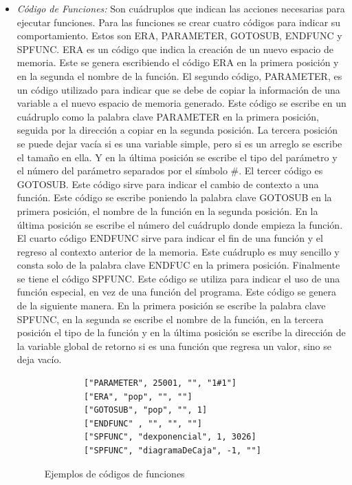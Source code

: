 \begin{itemize}
    \item \emph{Código de Funciones:} Son cuádruplos que indican las acciones necesarias para ejecutar funciones. Para las funciones se crear cuatro códigos para indicar su comportamiento. Estos son ERA, PARAMETER, GOTOSUB, ENDFUNC y SPFUNC. ERA es un código que indica la creación de un nuevo espacio de memoria. Este se genera escribiendo el código ERA en la primera posición y en la segunda el nombre de la función. El segundo código, PARAMETER, es un código utilizado para indicar que se debe de copiar la información de una variable a el nuevo espacio de memoria generado. Este código se escribe en un cuádruplo como la palabra clave PARAMETER en la primera posición, seguida por la dirección a copiar en la segunda posición. La tercera posición se puede dejar vacía si es una variable simple, pero si es un arreglo se escribe el tamaño en ella. Y en la última posición se escribe el tipo del parámetro y el número del parámetro separados por el símbolo \#. El tercer código es GOTOSUB. Este código sirve para indicar el cambio de contexto a una función. Este código se escribe poniendo la palabra clave GOTOSUB en la primera posición, el nombre de la función en la segunda posición. En la última posición se escribe el número del cuádruplo donde empieza la función. El cuarto código ENDFUNC sirve para indicar el fin de una función y el regreso al contexto anterior de la memoria. Este cuádruplo es muy sencillo y consta solo de la palabra clave ENDFUC en la primera posición. Finalmente se tiene el código SPFUNC. Este código se utiliza para indicar el uso de una función especial, en vez de una función del programa. Este código se genera de la siguiente manera. En la primera posición se escribe la palabra clave SPFUNC, en la segunda se escribe el nombre de la función, en la tercera posición el tipo de la función y en la última posición se escribe la dirección de la variable global de retorno si es una función que regresa un valor, sino se deja vacío.
    
\begin{figure}[!htbp]
    \centering
    \begin{lstlisting}
        ["PARAMETER", 25001, "", "1#1"]
        ["ERA", "pop", "", ""]
        ["GOTOSUB", "pop", "", 1]
        ["ENDFUNC" , "", "", ""]
        ["SPFUNC", "dexponencial", 1, 3026]
        ["SPFUNC", "diagramaDeCaja", -1, ""]
    \end{lstlisting}
    \caption{Ejemplos de códigos de funciones}
    \label{fig:my_label}
\end{figure}
\FloatBarrier
\end{itemize}

